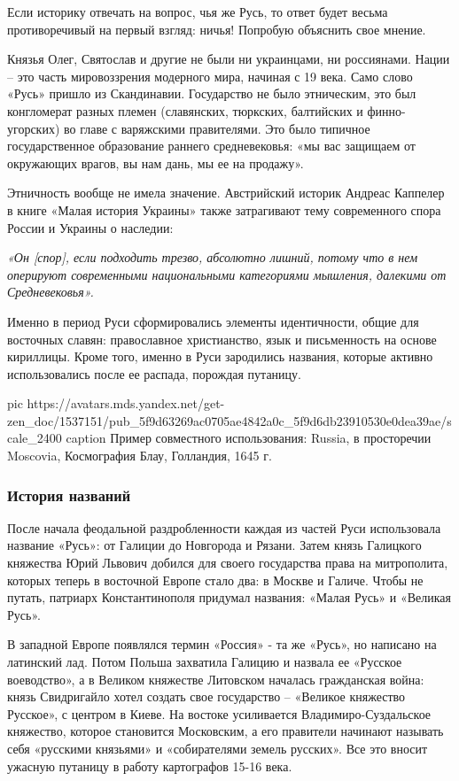 Если историку отвечать на вопрос, чья же Русь, то ответ будет весьма
противоречивый на первый взгляд: ничья! Попробую объяснить свое
мнение.

Князья Олег, Святослав и другие не были ни украинцами, ни россиянами. Нации –
это часть мировоззрения модерного мира, начиная с 19 века. Само
слово «Русь» пришло из Скандинавии. Государство не было
этническим, это был конгломерат разных племен (славянских,
тюркских, балтийских и финно-угорских) во главе с варяжскими
правителями. Это было типичное государственное образование
раннего средневековья: «мы вас защищаем от окружающих врагов,
вы нам дань, мы ее на продажу».

Этничность вообще не имела значение. Австрийский историк Андреас Каппелер в
книге «Малая история Украины» также затрагивают тему современного спора России
и Украины о наследии: 

\begin{leftbar}
	\begingroup
		\em
			«Он [спор], если подходить трезво, абсолютно лишний, потому что в нем оперируют современными национальными категориями мышления, далекими от Средневековья».
	\endgroup
\end{leftbar}

Именно в период Руси сформировались элементы идентичности, общие для восточных
славян: православное христианство, язык и письменность на основе кириллицы.
Кроме того, именно в Руси зародились названия, которые активно использовались
после ее распада, порождая путаницу.


\ifcmt
  pic https://avatars.mds.yandex.net/get-zen_doc/1537151/pub_5f9d63269ac0705ae4842a0c_5f9d6db23910530e0dea39ae/scale_2400
  caption Пример совместного использования: Russia, в просторечии Moscovia, Космография Блау, Голландия, 1645 г. 
\fi

\subsubsection{История названий}

После начала феодальной раздробленности каждая из частей Руси использовала
название «Русь»: от Галиции до Новгорода и Рязани. Затем князь Галицкого
княжества Юрий Львович добился для своего государства права на митрополита,
которых теперь в восточной Европе стало два: в Москве и Галиче. Чтобы не
путать, патриарх Константинополя придумал названия: «Малая Русь» и «Великая
Русь».

В западной Европе появлялся термин «Россия» - та же «Русь», но написано на
латинский лад. Потом Польша захватила Галицию и назвала ее «Русское
воеводство», а в Великом княжестве Литовском началась гражданская война: князь
Свидригайло хотел создать свое государство – «Великое княжество Русское», с
центром в Киеве. На востоке усиливается Владимиро-Суздальское княжество,
которое становится Московским, а его правители начинают называть себя «русскими
князьями» и «собирателями земель русских». Все это вносит ужасную путаницу в
работу картографов 15-16 века.

